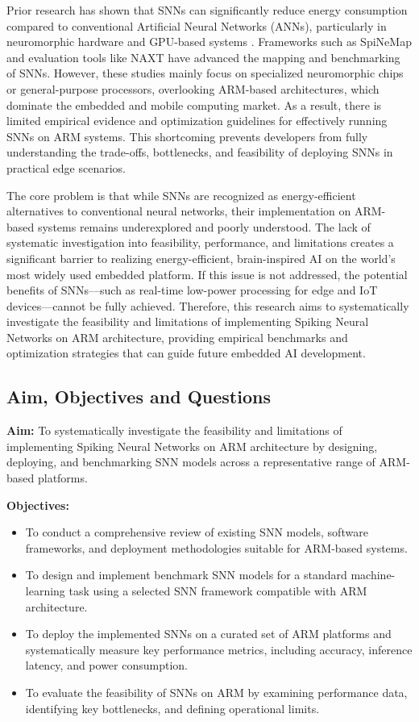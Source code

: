 \documentclass[a4paper,12pt]{article}
\begin{document}
	Prior research has shown that SNNs can significantly reduce energy consumption compared to conventional Artificial Neural Networks (ANNs), particularly in neuromorphic hardware and GPU-based systems \citep{Bouvier2019, Bu2022}. Frameworks such as SpiNeMap \citep{Balaji2019} and evaluation tools like NAXT \citep{Abderrahmane2020} have advanced the mapping and benchmarking of SNNs. However, these studies mainly focus on specialized neuromorphic chips or general-purpose processors, overlooking ARM-based architectures, which dominate the embedded and mobile computing market. As a result, there is limited empirical evidence and optimization guidelines for effectively running SNNs on ARM systems. This shortcoming prevents developers from fully understanding the trade-offs, bottlenecks, and feasibility of deploying SNNs in practical edge scenarios.
	
	The core problem is that while SNNs are recognized as energy-efficient alternatives to conventional neural networks, their implementation on ARM-based systems remains underexplored and poorly understood. The lack of systematic investigation into feasibility, performance, and limitations creates a significant barrier to realizing energy-efficient, brain-inspired AI on the world’s most widely used embedded platform. If this issue is not addressed, the potential benefits of SNNs—such as real-time low-power processing for edge and IoT devices—cannot be fully achieved. Therefore, this research aims to systematically investigate the feasibility and limitations of implementing Spiking Neural Networks on ARM architecture, providing empirical benchmarks and optimization strategies that can guide future embedded AI development.
	
	\subsection{Aim, Objectives and Questions}
	\textbf{Aim:} To systematically investigate the feasibility and limitations of implementing Spiking Neural Networks on ARM architecture by designing, deploying, and benchmarking SNN models across a representative range of ARM-based platforms.
	
	\textbf{Objectives:}
	\begin{itemize}
		\item To conduct a comprehensive review of existing SNN models, software frameworks, and deployment methodologies suitable for ARM-based systems.
		\item To design and implement benchmark SNN models for a standard machine-learning task using a selected SNN framework compatible with ARM architecture.
		\item To deploy the implemented SNNs on a curated set of ARM platforms and systematically measure key performance metrics, including accuracy, inference latency, and power consumption.
		\item To evaluate the feasibility of SNNs on ARM by examining performance data, identifying key bottlenecks, and defining operational limits.
	\end{itemize}
	
\end{document}
